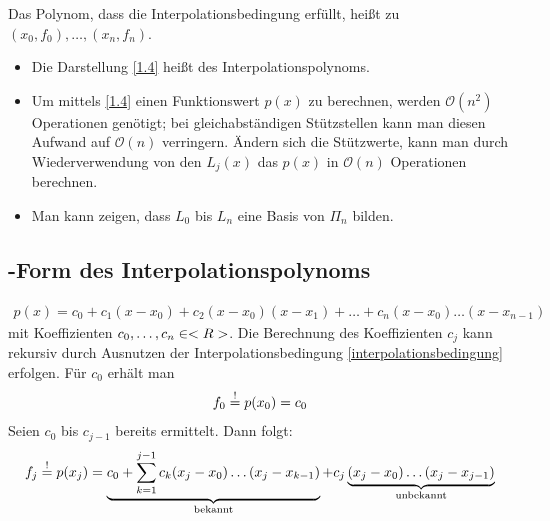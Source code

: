 \begin{*definition}[Interpolationspolynom]
	Das Polynom, dass die Interpolationsbedingung erfüllt, heißt  zu $(x_0,f_0),\dots,(x_n,f_n)$.
\end{*definition}

\begin{remark}
	\begin{itemize}
		\item Die Darstellung \cref{1.4} heißt  des Interpolationspolynoms.
		\item Um mittels \cref{1.4} einen Funktionswert $p(x)$ zu berechnen, werden $\mathcal{O}(n^2)$ Operationen genötigt; bei gleichabständigen Stützstellen kann man diesen Aufwand auf $\mathcal{O}(n)$ verringern. Ändern sich die Stützwerte, kann man durch Wiederverwendung von den $L_j(x)$ das $p(x)$ in $\mathcal{O}(n)$ Operationen berechnen.
		\item Man kann zeigen, dass $L_0$ bis $L_n$ eine Basis von $\Pi_n$ bilden.
	\end{itemize}
\end{remark}

\subsection{-Form des Interpolationspolynoms}

\begin{align}
	\label{1.5}
	p(x) = c_0 + c_1(x-x_0)+c_2(x-x_0)(x-x_1)+\dots+c_n(x-x_0)\dots(x-x_{n-1})
\end{align}
mit Koeffizienten $c_0,\dots,c_n\in<R>$. Die Berechnung des Koeffizienten $c_j$ kann rekursiv durch Ausnutzen der Interpolationsbedingung \cref{interpolationsbedingung} erfolgen. Für $c_0$ erhält man
\begin{align}
	f_0 \overset{!}{=} p(x_0) = c_0 \notag
\end{align}
Seien $c_0$ bis $c_{j-1}$ bereits ermittelt. Dann folgt:
\begin{align}
	f_j \overset{!}{=} p(x_j) = \underbrace{c_0 + \sum_{k=1}^{j-1} c_k(x_j-x_0)\dots(x_j-x_{k-1})}_{\text{bekannt}} + c_j \underbrace{(x_j-x_0)\dots(x_j-x_{j-1})}_{\text{unbekannt}}\notag
\end{align} 

